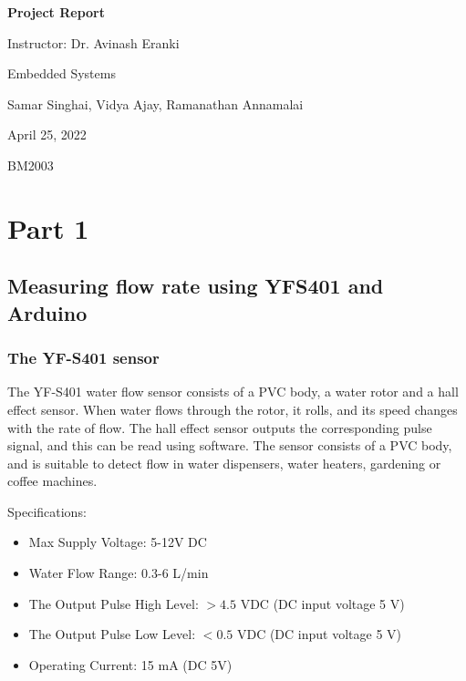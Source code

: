 \documentclass[12pt]{article}
\begin{document}
\begin{titlepage}
   \begin{center}
        \vspace*{4cm} %

        \Huge{\textbf {Project Report}} 

        \vspace{0.5cm}
        \LARGE{Instructor: Dr. Avinash Eranki}
            
        \vspace{3 cm}
        \Large{Embedded Systems}
       
        \vspace{0.25cm}
        \large{Samar Singhai, Vidya Ajay, Ramanathan Annamalai}
       
        \vspace{3 cm}
        \Large{April 25, 2022}
        
        \vspace{0.25 cm}
        \Large{BM2003}
       

       \vfill
    \end{center}
\end{titlepage}

\setcounter{page}{2}
\pagestyle{fancy}
\fancyhf{}
\rhead{\thepage}
\section*{Part 1}
\subsection*{Measuring flow rate using YFS401 and Arduino}
\subsubsection*{The YF-S401 sensor}
The YF-S401 water flow sensor consists of a PVC body, a water rotor and a hall effect sensor. When water flows through the rotor, it rolls, and its speed changes with the rate of flow. The hall effect sensor outputs the corresponding pulse signal, and this can be read using software. The sensor consists of a PVC body, and is suitable to detect flow in water dispensers, water heaters, gardening or coffee machines.

Specifications:
\begin{itemize}
    \item Max Supply Voltage: 5-12V DC
    \item Water Flow Range: 0.3-6 L/min
    \item The Output Pulse High Level: $>4.5$ VDC (DC input voltage 5 V)
    \item The Output Pulse Low Level: $<0.5$ VDC (DC input voltage 5 V)
    \item Operating Current: 15 mA (DC 5V)
\end{itemize}
\end{document}
